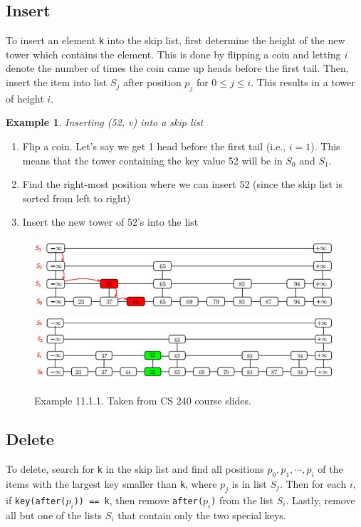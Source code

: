 \documentclass{report}
\newtheorem{ex}{Example}[section]
\begin{document}
\subsection{Insert}
To insert an element \texttt{k} into the skip list, first determine the height of the new tower which contains the element. This is done by flipping a coin and letting \textit{i} denote the number of times the coin came up heads before the first tail. Then, insert the item into list $S_j$ after position $p_j$ for $0 \leq j \leq i$. This results in a tower of height $i$.
\begin{ex}
Inserting (52, v) into a skip list
\end{ex}
\begin{enumerate}
\item Flip a coin. Let's say  we get 1 head before the first tail (i.e., $i=1$). This means that the tower containing the key value 52 will be in $S_0$ and $S_1$.
\item Find the right-most position where we can insert 52 (since the skip list is sorted from left to right)
\item Insert the new tower of 52's into the list
\end{enumerate}
\begin{figure}[ht]
\begin{center}
\includegraphics[scale=0.7]{insert1.jpg}
\includegraphics[scale=0.7]{insert2.jpg}
\end{center}
\caption{Example 11.1.1. Taken from CS 240 course slides.}
\end{figure}
\subsection{Delete}
To delete, search for \texttt{k} in the skip list and find all positions $p_0, p_1, \cdots, p_i$ of the items with the largest key smaller than \texttt{k}, where $p_j$ is in list $S_j$. Then for each $i$, if \texttt{key(after($p_i$)) == k}, then remove \texttt{after($p_i$)} from the list $S_i$. Lastly, remove all but one of the lists $S_i$ that contain only the two special keys.
\end{document}
